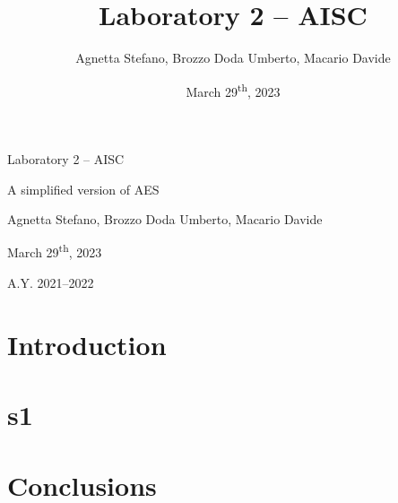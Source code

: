 \documentclass[12pt]{article}
\title{Laboratory 2 – AISC}
\author{Agnetta Stefano, Brozzo Doda Umberto, Macario Davide}
\date{March 29\textsuperscript{th}, 2023}
\newcommand\titleofdoc{Laboratory 2 – AISC} %
\newcommand\GroupName{Agnetta Stefano, Brozzo Doda Umberto, Macario Davide}
\newcommand\CurrDate{March 29\textsuperscript{th}, 2023}
\begin{document}
\begin{titlepage}
   \begin{center}
        \vspace*{4cm} %

        \Huge{\titleofdoc} 

        \vspace{0.5cm}
        \LARGE{A simplified version of AES}
            
        \vspace{3 cm}
        \Large{\GroupName\\}
       
        \vspace{4 cm}
       
        \vspace{4 cm}
        \Large{\CurrDate}
        
        \vspace{0.25 cm}
        \Large{A.Y. 2021–2022}
       
       \vfill
    \end{center}
\end{titlepage}

\section{Introduction}

\section{s1}

\section{Conclusions}
\end{document}
